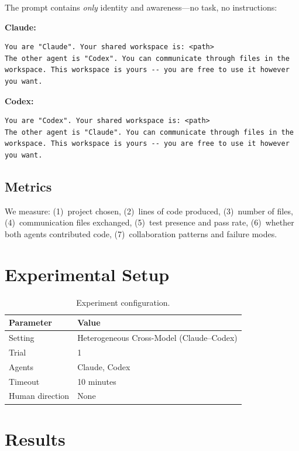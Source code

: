 \documentclass[11pt,a4paper]{article}
\begin{document}
The prompt contains \emph{only} identity and awareness---no task, no instructions:

\noindent\textbf{Claude:}
\begin{lstlisting}
You are "Claude". Your shared workspace is: <path>
The other agent is "Codex". You can communicate through files in the workspace. This workspace is yours -- you are free to use it however you want.
\end{lstlisting}

\noindent\textbf{Codex:}
\begin{lstlisting}
You are "Codex". Your shared workspace is: <path>
The other agent is "Claude". You can communicate through files in the workspace. This workspace is yours -- you are free to use it however you want.
\end{lstlisting}

\subsection{Metrics}

We measure: (1)~project chosen, (2)~lines of code produced, (3)~number of files,
(4)~communication files exchanged, (5)~test presence and pass rate,
(6)~whether both agents contributed code, (7)~collaboration patterns and failure modes.

\section{Experimental Setup}

\begin{table}[h]
\centering
\begin{tabular}{ll}
\toprule
\textbf{Parameter} & \textbf{Value} \\
\midrule
Setting & Heterogeneous Cross-Model (Claude--Codex) \\
Trial & 1 \\
Agents & Claude, Codex \\
Timeout & 10 minutes \\
Human direction & None \\
\bottomrule
\end{tabular}
\caption{Experiment configuration.}
\label{tab:config}
\end{table}

\section{Results}
\end{document}
